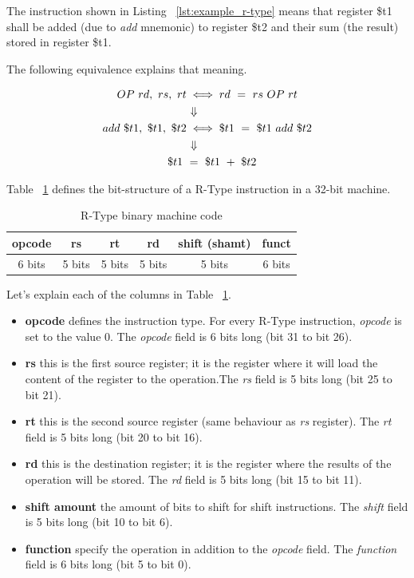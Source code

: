 \documentclass[
  oneside,
  11pt, a4paper,
  footinclude=true,
  headinclude=true,
  cleardoublepage=empty
]{scrbook}
\begin{document}
The instruction shown in Listing ~\ref{lst:example_r-type} means that register \$t1 shall be added (due to \textit{add} mnemonic) to register \$t2 and their sum (the result) stored in register \$t1.

The following equivalence explains that meaning.

\begin{align*}
  OP\ rd,\ rs,\ rt &\iff rd\ =\ rs\ OP\ rt\\
  &\makebox[\widthof{${}={}$}]{$\Downarrow$} \\
  add\ \$t1,\ \$t1,\ \$t2 &\iff \$t1\ =\ \$t1\ add\ \$t2 \\
  &\makebox[\widthof{${}={}$}]{$\Downarrow$} \\
  \$t1\ &=\ \$t1\ +\ \$t2
\end{align*}

Table ~\ref{tbl:r-type_binary_machine_code} defines the bit-structure of a R-Type instruction in a 32-bit machine.

\begin{table}[h!]
\centering
\caption{R-Type binary machine code}
\label{tbl:r-type_binary_machine_code}
\begin{tabular}{|c|c|c|c|c|c|}
\hline
\textbf{opcode} & \textbf{rs} & \textbf{rt} & \textbf{rd} & \textbf{shift (shamt)} & \textbf{funct} \\ \hline
6 bits          & 5 bits      & 5 bits      & 5 bits      & 5 bits                & 6 bits         \\ \hline
\end{tabular}
\end{table}

Let's explain each of the columns in Table ~\ref{tbl:r-type_binary_machine_code}.

\begin{itemize}
\item \textbf{opcode}  defines the instruction type. For every R-Type instruction, \textit{opcode} is set to the value 0. The \textit{opcode} field is 6 bits long (bit 31 to bit 26).
\item \textbf{rs} this is the first source register; it is the register where it will load the content of the register to the operation.The \textit{rs} field is 5 bits long (bit 25 to bit 21).
\item \textbf{rt} this is the second source register (same behaviour as \textit{rs} register). The \textit{rt} field is 5 bits long (bit 20 to bit 16).
\item \textbf{rd} this is the destination register; it is the register where the results of the operation will be stored. The \textit{rd} field is 5 bits long (bit 15 to bit 11).
\item \textbf{shift amount} the amount of bits to shift for shift instructions. The \textit{shift} field is 5 bits long (bit 10 to bit 6).
\item \textbf{function} specify the operation in addition to the \textit{opcode} field. The \textit{function} field is 6 bits long (bit 5 to bit 0).

\end{itemize}
\end{document}
